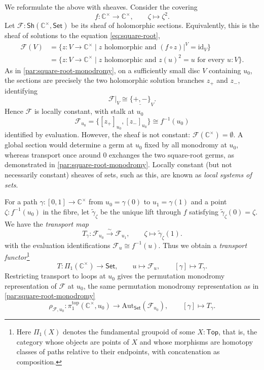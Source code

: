 \documentclass[11pt,letterpaper]{article}
\theoremstyle{numberfirstplain}
\numberwithin{equation}{theorem}
\theoremstyle{numberfirstupright}
\begin{document}
We reformulate the above with sheaves. Consider the covering
$$f:\mathbb C^\times\rightarrow\mathbb C^\times,\qquad \zeta\mapsto\zeta^2.$$
Let $\mathcal F:\mathsf{Sh}(\mathbb C^\times,\mathsf{Set})$ be its sheaf of holomorphic sections. Equivalently, this is the sheaf of solutions to the equation \eqref{eq:square-root},
\[
\begin{aligned}
\mathcal F(V)&=\{z:V\to\mathbb C^\times\mid z\text{ holomorphic and }(f\circ z)|^V=\mathrm{id}_V\}\\
&=\{z:V\to\mathbb C^\times\mid z\text{ holomorphic and }z(u)^2=u\text{ for every }u:V\}.
\end{aligned}
\]
As in \cref{par:square-root-monodromy}, on a sufficiently small disc $V$ containing $u_0$, the sections are precisely the two holomorphic solution branches $z_+$ and $z_-$, identifying 
$$\mathcal F|_V\cong\underline{\{+,-\}}_V.$$
Hence $\mathcal F$ is locally constant, with stalk at $u_0$
$$\mathcal F_{u_0}=\{[z_+]_{u_0},[z_-]_{u_0}\}\cong f^{-1}(u_0)$$ 
identified by evaluation. 
However, the sheaf is not constant: $\mathcal F(\mathbb C^\times)=\emptyset$. A global section would determine a germ at $u_0$ fixed by all monodromy at $u_0$, whereas transport once around $0$ exchanges the two square-root germs, as demonstrated in \cref{par:square-root-monodromy}. 
Locally constant (but not necessarily constant) sheaves of sets, such as this, are known as \textit{local systems of sets}. 


For a path $\gamma:[0,1]\to\mathbb C^\times$ from $u_0=\gamma(0)$ to $u_1=\gamma(1)$ and a point $\zeta:f^{-1}(u_0)$ in the fibre, let $\widetilde\gamma_\zeta$ be the unique lift through $f$ satisfying $\widetilde\gamma_\zeta(0)=\zeta$.
We have the \textit{transport map}
\[
T_\gamma:\mathcal F_{u_0}\xrightarrow{\sim}\mathcal F_{u_1},\qquad \zeta\longmapsto\widetilde\gamma_\zeta(1).
\]
with the evaluation identifications $\mathcal F_u\cong f^{-1}(u)$.
Thus we obtain a \textit{transport functor}\footnote{Here $\Pi_1(X)$ denotes the fundamental groupoid of some $X:\mathsf{Top}$, that is, the category whose objects are points of $X$ and whose morphisms are homotopy classes of paths relative to their endpoints, with concatenation as composition.}
\[
T:\Pi_1(\mathbb C^\times)\longrightarrow\mathsf{Set},\qquad u\longmapsto\mathcal F_u,\qquad [\gamma]\longmapsto T_\gamma.
\]
Restricting transport to loops at $u_0$ gives the permutation monodromy representation of $\mathcal F$ at $u_0$, the same permutation monodromy representation as in \cref{par:square-root-monodromy}
$$\rho_{\mathcal F,u_0}:\pi_1^{\mathrm{top}}(\mathbb C^\times,u_0)\rightarrow\mathrm{Aut}_{\mathsf{Set}}(\mathcal F_{u_0}),\qquad [\gamma]\mapsto T_\gamma.$$
\end{document}
